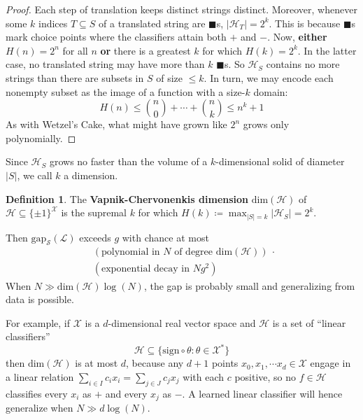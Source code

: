 \documentclass[twocolumn, 11pt]{article}
\newcommand{\Hh}{\mathcal{H}}
\newcommand{\Ll}{\mathcal{L}}
\newcommand{\Ss}{\mathcal{S}}
\newcommand{\Xx}{\mathcal{X}}
\newcommand{\Egap}{\text{gap}_{\Ss}}
\theoremstyle{definition}
\newtheorem*{dfn}{Definition}
\begin{document}
\begin{proof}
            Each step of translation keeps distinct strings distinct.
            Moreover, whenever some $k$ indices $T\subseteq S$ of a translated
            string are $\blacksquare$s, $|\Hh_T| = 2^k$.  This is because
            $\blacksquare$s mark choice points where the classifiers attain
            both $+$ and $-$.
            Now, \textbf{either} $H(n)=2^n$ for all $n$ \textbf{or} there is a
            greatest $k$ for which $H(k) = 2^k$.  In the latter case, no
            translated string may have more than $k$ $\blacksquare$s.  So
            $\Hh_S$ contains no more strings than there are subsets in $S$ of
            size $\leq k$.  In turn, we may encode each nonempty subset as the
            image of a function with a size-$k$ domain:
            $$
                H(n)
                \leq 
                {n\choose 0} + \cdots + {n\choose k}
                \leq 
                n^k + 1
            $$
            As with Wetzel's Cake, what might have grown like $2^n$ grows only
            polynomially.
        \end{proof}
    
        Since $\Hh_S$ grows no faster than the volume of a
        $k$-dimensional solid of diameter $|S|$, we call $k$ a dimension.
        \begin{dfn}
            The \textbf{Vapnik-Chervonenkis dimension} $\text{dim}(\Hh)$
            of $\Hh \subseteq \{\pm 1\}^\Xx$
            is the supremal $k$ for which $H(k) \coloneqq
            \max_{|S|=k} |\Hh_S| = 2^k$.  
        \end{dfn}

        Then $\Egap(\Ll)$ exceeds $g$ with chance at most
        \begin{align*}
            &(\text{polynomial in $N$ of degree $\text{dim}(\Hh)$}) ~\cdot~ \\
            &(\text{exponential decay in $Ng^2$})
        \end{align*}
        When $N\gg \text{dim}(\Hh) \log(N)$, the gap is probably small and
        generalizing from data is possible.

        For example, if $\Xx$ is a $d$-dimensional real vector space
        and $\Hh$ is a set of ``linear classifiers''
        $$
            \Hh \subseteq \{
                \text{sign} \circ \theta
                :
                \theta \in \Xx^*
            \}
        $$
        then $\text{dim}(\Hh)$ is at most $d$,
        because any $d+1$ points $x_0, x_1,\cdots x_d \in \Xx$ engage in
        a linear relation
        $
            \sum_{i\in I} c_i x_i
            =
            \sum_{j\in J} c_j x_j
        $
        with each $c$ positive, so no $f\in \Hh$ classifies every $x_i$ as $+$
        and every $x_j$ as $-$.  A learned linear classifier will hence
        generalize when $N \gg d \log(N)$.
\end{document}

